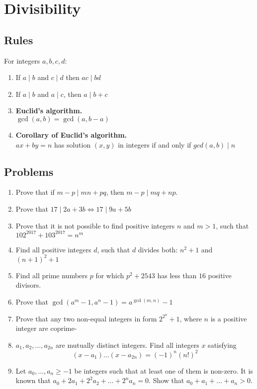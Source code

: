 \documentclass{article}
\begin{document}
\section{Divisibility}
\subsection{Rules}
For integers $a,b,c,d$:
	\begin{enumerate}
		\item 
		If $a \mid b$ and $ c \mid d$ then $ac \mid bd$
		\item
		If $a \mid b$ and $a \mid c$, then $a \mid b+c$ 
		\item 
		\textbf{Euclid's algorithm.} \\
		$\gcd (a,b) = \gcd (a,b-a)$ 
		\item 
		\textbf{Corollary of Euclid's algorithm.} \\
		$ax+by=n$ has solution $(x,y)$ in integers if and only if $gcd(a,b) \mid n$
	\end{enumerate}
\subsection{Problems}
\begin{enumerate}
	\item
	Prove that if $m-p \mid mn +pq$, then $m-p \mid mq +np$.

	\item 
	Prove that $17 \mid 2a+3b  \iff 17 \mid 9a+5b$

	\item
	Prove that it is not possible to find positive integers $n$ and $m>1$, such that ${102^{2017}+103^{2017}=n^m}$

	\item
	Find all positive integers $d$, such that $d$ divides both: $n^2+1$ and $(n+1)^2+1$
	
	\item 
	Find all prime numbers $p$ for which $p^2+2543$ has less than $16$ positive divisors.
	
	\item 
	Prove that $\gcd (a^m-1,a^n-1)=a^{\gcd(m,n)}-1$
	
	\item %
	Prove that any two non-equal integers in form $2^{2^n}+1$, where $n$ is a positive integer are coprime-
		

	\item %
	$a_1,a_2,\dots,a_{2n}$ are mutually distinct integers. Find all integers $x$ satisfying
	$$(x-a_1)\dots (x-a_{2n}) = (-1)^n(n!)^2$$
	
	\item %
	Let $a_0,\dots, a_n \geq -1$ be integers such that at least one of them is non-zero. It is known that $a_0 + 2a_1 +2^2a_2+ \dots + 2^na_n = 0$. Show that $a_0+a_1+\dots + a_n >0$.
	
\end{enumerate}
\end{document}

